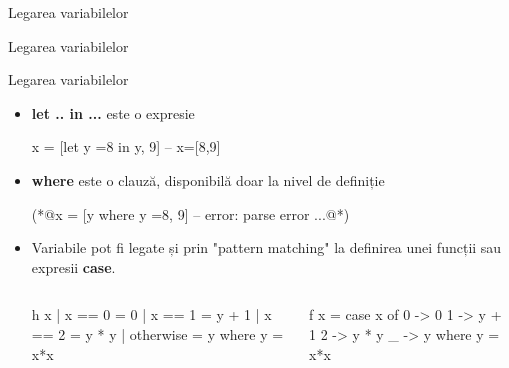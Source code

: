 \documentclass[xcolor=pdftex,romanian,colorlinks]{beamer}
\begin{document}
\begin{section}{Legarea variabilelor}
\begin{frame}[fragile]{Legarea variabilelor}
\begin{itemize}
\begin{asciihs}
\end{asciihs}

\end{itemize}
\end{frame}

\begin{frame}[fragile]{Legarea variabilelor}
\begin{itemize}
\item {\bf let .. in ...}  este o expresie
\begin{asciihs}
x = [let y =8 in y, 9] -- x=[8,9]
\end{asciihs}

 \item {\bf where} este o clauză, disponibilă doar la nivel de definiție
 \begin{asciihs}
 (*@\color{red}x = [y where y =8, 9] -- error: parse error ...@*)
\end{asciihs}

\item Variabile pot fi legate și prin "pattern matching" la definirea unei funcții sau expresii {\bf case}.
\begin{columns}
\begin{column}{0.4\textwidth}
\begin{asciihs}
h x | x == 0   =  0
    | x == 1   = y + 1
    | x == 2   = y * y
    | otherwise = y
  where y = x*x
\end{asciihs}
\end{column}
\begin{column}{0.5\textwidth}
\begin{asciihs}
f x = case x of
             0 ->  0
             1 -> y + 1
             2 -> y * y
             _ -> y
  where y = x*x
\end{asciihs}
\end{column}
\end{columns}



\end{itemize}
\end{frame}

\end{section}
\end{document}
